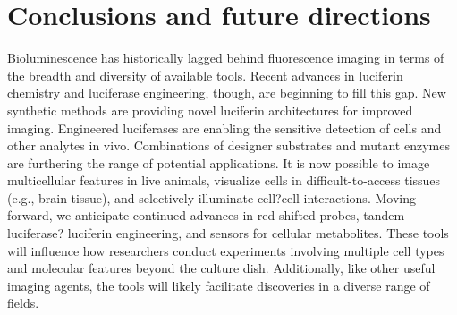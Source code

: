 \section{Conclusions and future directions}
Bioluminescence has historically lagged behind fluorescence
imaging in terms of the breadth and diversity of available tools.
Recent advances in luciferin chemistry and luciferase engineering,
though, are beginning to fill this gap. New synthetic
methods are providing novel luciferin architectures for
improved imaging. Engineered luciferases are enabling the
sensitive detection of cells and other analytes in vivo.
Combinations of designer substrates and mutant enzymes are
furthering the range of potential applications. It is now possible
to image multicellular features in live animals, visualize cells in
difficult-to-access tissues (e.g., brain tissue), and selectively
illuminate cell?cell interactions. Moving forward, we anticipate
continued advances in red-shifted probes, tandem luciferase?
luciferin engineering, and sensors for cellular metabolites.
These tools will influence how researchers conduct experiments
involving multiple cell types and molecular features beyond the
culture dish. Additionally, like other useful imaging agents, the
tools will likely facilitate discoveries in a diverse range of fields.

